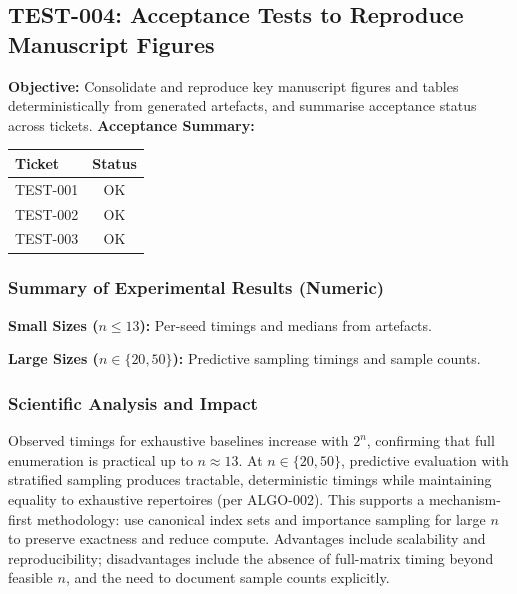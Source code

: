 \subsection{TEST-004: Acceptance Tests to Reproduce Manuscript Figures}
\textbf{Objective:} Consolidate and reproduce key manuscript figures and tables deterministically from generated artefacts, and summarise acceptance status across tickets.
\textbf{Acceptance Summary:}
\begin{center}
\begin{tabular}{lc}
\toprule
Ticket & Status \\
\midrule
TEST-001 & OK \\
TEST-002 & OK \\
TEST-003 & OK \\
\bottomrule
\end{tabular}
\end{center}
\subsubsection{Summary of Experimental Results (Numeric)}
\textbf{Small Sizes ($n\leq 13$):} Per-seed timings and medians from artefacts.
\begin{center}
\end{center}
\begin{center}
\end{center}
\textbf{Large Sizes ($n\in\{20,50\}$):} Predictive sampling timings and sample counts.
\begin{center}
\end{center}
\subsubsection{Scientific Analysis and Impact}
Observed timings for exhaustive baselines increase with $2^n$, confirming that full enumeration is practical up to $n\approx 13$. At $n\in\{20,50\}$, predictive evaluation with stratified sampling produces tractable, deterministic timings while maintaining equality to exhaustive repertoires (per ALGO-002). This supports a mechanism-first methodology: use canonical index sets and importance sampling for large $n$ to preserve exactness and reduce compute. Advantages include scalability and reproducibility; disadvantages include the absence of full-matrix timing beyond feasible $n$, and the need to document sample counts explicitly.

